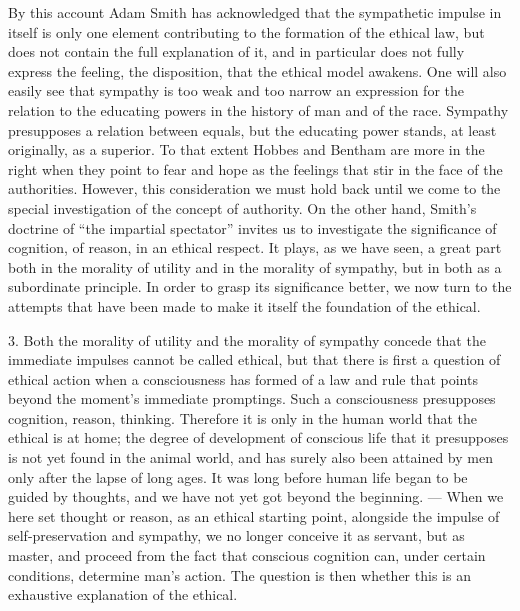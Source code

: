 \documentclass[12pt,a4paper,openany]{book}
\newcommand{\opage}[1]{\marginnote{\footnotesize\textit{[#1]}}}
\begin{document}
\opage{43}By this account Adam Smith has acknowledged that the sympathetic
impulse in itself is only one element contributing to the formation of the
ethical law, but does not contain the full explanation of it, and in
particular does not fully express the feeling, the disposition, that the
ethical model awakens. One will also easily see that sympathy is too weak and
too narrow an expression for the relation to the educating powers in the
history of man and of the race. Sympathy presupposes a relation between
equals, but the educating power stands, at least originally, as a superior. To
that extent Hobbes and Bentham are more in the right when they point to fear
and hope as the feelings that stir in the face of the authorities. However,
this consideration we must hold back until we come to the special
investigation of the concept of authority. On the other hand, Smith's doctrine
of ``the impartial spectator'' invites us to investigate the significance of
cognition, of reason, in an ethical respect. It plays, as we have seen, a
great part both in the morality of utility and in the morality of sympathy,
but in both as a subordinate principle. In order to grasp its significance
better, we now turn to the attempts that have been made to make it itself the
foundation of the ethical.

3. Both the morality of utility and the morality of sympathy concede that the
immediate impulses cannot be called ethical, but that there is first a
question of ethical action when a consciousness has formed of a law and rule
that points beyond the moment's \opage{44}immediate promptings. Such a
consciousness presupposes cognition, reason, thinking. Therefore it is only in
the human world that the ethical is at home; the degree of development of
conscious life that it presupposes is not yet found in the animal world, and
has surely also been attained by men only after the lapse of long ages. It was
long before human life began to be guided by thoughts, and we have not yet got
beyond the beginning. --- When we here set thought or reason, as an ethical
starting point, alongside the impulse of self-preservation and sympathy, we no
longer conceive it as servant, but as master, and proceed from the fact that
conscious cognition can, under certain conditions, determine man's action. The
question is then whether this is an exhaustive explanation of the ethical.
\end{document}
